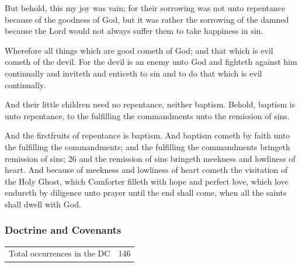 \begin{compactdesc}
			\item[Mormon 2:13] But behold, this my joy was vain; for their sorrowing was not unto repentance because of the goodness of God, but it was rather the sorrowing of the damned because the Lord would not always suffer them to take happiness in sin.
			\item[Moroni 7:12] Wherefore all things which are good cometh of God; and that which is evil cometh of the devil. For the devil is an enemy unto God and fighteth against him continually and inviteth and enticeth to sin and to do that which is evil continually.
			\item[Moroni 8:11] And their little children need no repentance, neither baptism. Behold, baptism is unto repentance, to the fulfilling the commandments unto the remission of sins.
			\item[Moroni 8:25--26] And the firstfruits of repentance is baptism. And baptism cometh by faith unto the fulfilling the commandments; and the fulfilling the commandments bringeth remission of sins; 26 and the remission of sins bringeth meekness and lowliness of heart. And because of meekness and lowliness of heart cometh the visitation of the Holy Ghost, which Comforter filleth with hope and perfect love, which love endureth by diligence unto prayer until the end shall come, when all the saints shall dwell with God.
		\end{compactdesc}
		
	\subsubsection{Doctrine and Covenants} %
		\label{SIN-DC}
	
		\begin{tabular}{ll}
			Total occurrences in the DC & 146 %
		\end{tabular}
		
